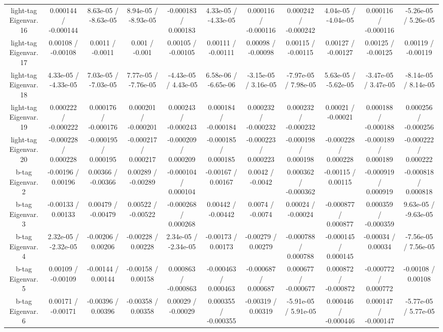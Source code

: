 \begin{table}[htbp]
\begin{center}
\begin{tabular}{|c|c|c|c|c|c|c|c|c|c|c|}
  light-tag Eigenvar. 16 & 0.000144 / -0.000144 & 8.63e-05 / -8.63e-05 & 8.94e-05 / -8.93e-05 & -0.000183 / 0.000183 & 4.33e-05 / -4.33e-05 & 0.000116 / -0.000116 & 0.000242 / -0.000242 & 4.04e-05 / -4.04e-05 & 0.000116 / -0.000116 & -5.26e-05 / 5.26e-05 \\ 
  light-tag Eigenvar. 17 & 0.00108 / -0.00108 & 0.0011 / -0.0011 & 0.001 / -0.001 & 0.00105 / -0.00105 & 0.00111 / -0.00111 & 0.00098 / -0.00098 & 0.00115 / -0.00115 & 0.00127 / -0.00127 & 0.00125 / -0.00125 & 0.00119 / -0.00119 \\ 
  light-tag Eigenvar. 18 & 4.33e-05 / -4.33e-05 & 7.03e-05 / -7.03e-05 & 7.77e-05 / -7.76e-05 & -4.43e-05 / 4.43e-05 & 6.58e-06 / -6.65e-06 & -3.15e-05 / 3.16e-05 & -7.97e-05 / 7.98e-05 & 5.63e-05 / -5.62e-05 & -3.47e-05 / 3.47e-05 & -8.14e-05 / 8.14e-05 \\ 
  light-tag Eigenvar. 19 & 0.000222 / -0.000222 & 0.000176 / -0.000176 & 0.000201 / -0.000201 & 0.000243 / -0.000243 & 0.000184 / -0.000184 & 0.000232 / -0.000232 & 0.000232 / -0.000232 & 0.00021 / -0.00021 & 0.000188 / -0.000188 & 0.000256 / -0.000256 \\ 
  light-tag Eigenvar. 20 & -0.000228 / 0.000228 & -0.000195 / 0.000195 & -0.000217 / 0.000217 & -0.000209 / 0.000209 & -0.000185 / 0.000185 & -0.000223 / 0.000223 & -0.000198 / 0.000198 & -0.000228 / 0.000228 & -0.000189 / 0.000189 & -0.000222 / 0.000222 \\ 
  b-tag Eigenvar. 2 & -0.00196 / 0.00196 & 0.00366 / -0.00366 & 0.00289 / -0.00289 & -0.000104 / 0.000104 & -0.00167 / 0.00167 & 0.0042 / -0.0042 & 0.000362 / -0.000362 & -0.00115 / 0.00115 & -0.000919 / 0.000919 & -0.000818 / 0.000818 \\ 
  b-tag Eigenvar. 3 & -0.00133 / 0.00133 & 0.00479 / -0.00479 & 0.00522 / -0.00522 & -0.000268 / 0.000268 & 0.00442 / -0.00442 & 0.0074 / -0.0074 & 0.00024 / -0.00024 & -0.000877 / 0.000877 & 0.000359 / -0.000359 & 9.63e-05 / -9.63e-05 \\ 
  b-tag Eigenvar. 4 & 2.32e-05 / -2.32e-05 & -0.00206 / 0.00206 & -0.00228 / 0.00228 & 2.34e-05 / -2.34e-05 & -0.00173 / 0.00173 & -0.00279 / 0.00279 & -0.000788 / 0.000788 & -0.000145 / 0.000145 & -0.00034 / 0.00034 & -7.56e-05 / 7.56e-05 \\ 
  b-tag Eigenvar. 5 & 0.00109 / -0.00109 & -0.00144 / 0.00144 & -0.00158 / 0.00158 & 0.000863 / -0.000863 & -0.000463 / 0.000463 & -0.000687 / 0.000687 & 0.000677 / -0.000677 & 0.000872 / -0.000872 & -0.000772 / 0.000772 & -0.00108 / 0.00108 \\ 
  b-tag Eigenvar. 6 & 0.00171 / -0.00171 & -0.00396 / 0.00396 & -0.00358 / 0.00358 & 0.00029 / -0.00029 & 0.000355 / -0.000355 & -0.00319 / 0.00319 & -5.91e-05 / 5.91e-05 & 0.000446 / -0.000446 & 0.000147 / -0.000147 & -5.77e-05 / 5.77e-05 \\ 

\end{tabular}
\end{center}
\end{table}
